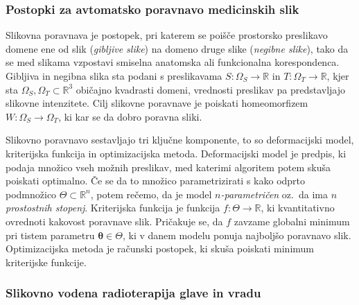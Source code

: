 \documentclass[a4paper,twoside,11pt]{article}
\begin{document}
	\subsubsection*{Postopki za avtomatsko poravnavo medicinskih slik}
	\par{
	  Slikovna poravnava je postopek, pri katerem se poišče prostorsko preslikavo domene ene od slik (\emph{gibljive slike}) na domeno druge slike (\emph{negibne slike}), tako da se med slikama vzpostavi smiselna anatomska ali funkcionalna korespondenca. Gibljiva in negibna slika sta podani s preslikavama $S\colon\Omega_S\rightarrow\mathbb{R}$ in $T\colon\Omega_T\rightarrow\mathbb{R}$, kjer sta $\Omega_S, \Omega_T\subset\mathbb{R}^3$ običajno kvadrasti domeni, vrednosti preslikav pa predstavljajo slikovne intenzitete. Cilj slikovne poravnave je poiskati homeomorfizem $W:\Omega_S\rightarrow\Omega_T$, ki kar se da dobro poravna sliki.
	}
	\par{
	  Slikovno poravnavo sestavljajo tri ključne komponente, to so deformacijski model, kriterijska funkcija in optimizacijska metoda. Deformacijski model je predpis, ki podaja množico vseh možnih preslikav, med katerimi algoritem potem skuša poiskati optimalno. Če se da to množico parametrizirati s kako odprto podmnožico $\Theta\subset\mathbb{R}^n$, potem rečemo, da je model \emph{$n$-parametričen} oz.~da ima \emph{$n$ prostostnih stopenj}. Kriterijska funkcija je funkcija $f\colon\Theta\rightarrow\mathbb{R}$, ki kvantitativno ovrednoti kakovost poravnave slik. Pričakuje se, da $f$ zavzame globalni minimum pri tistem parametru $\mathbf{\theta}\in\Theta$, ki v danem modelu ponuja najboljšo poravnavo slik. Optimizacijska metoda je računski postopek, ki skuša poiskati minimum kriterijske funkcije.
	}
	
	\subsubsection*{Slikovno vodena radioterapija glave in vradu}
	\par{
	  
	}
	  
	  
	  
	
	\subsubsection*{}
	\par{}
\end{document}
